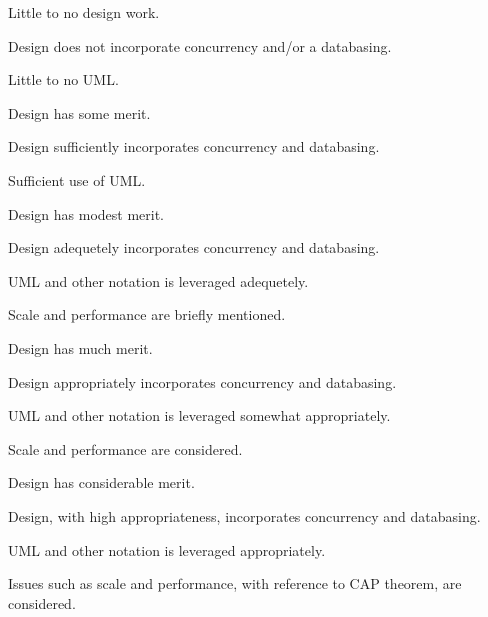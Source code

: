 \documentclass{../../fal_assignment}
\begin{document}
\rubricyeartwo
\begin{markingrubric}
%
%
        \grade\fail 	Little to no design work.
            \par 		Design does not incorporate concurrency and/or a databasing.
          \par 		Little to no UML.
          
        \grade 		Design has some merit.
            \par 		Design sufficiently incorporates concurrency and databasing. 
          \par 		Sufficient use of UML.
          
        \grade 		Design has modest merit.
            \par 		Design adequetely incorporates concurrency and databasing.  
          \par 		UML and other notation is leveraged adequetely.
            \par 		Scale and performance are briefly mentioned.
            
        \grade 		Design has much merit.
            \par 		Design appropriately incorporates concurrency and databasing.  
          \par 		UML and other notation is leveraged somewhat appropriately.
            \par 		Scale and performance are considered.
            
        \grade 		Design has considerable merit.
            \par 		Design, with high appropriateness, incorporates concurrency and databasing.  
          \par 		UML and other notation is leveraged appropriately.
            \par 		Issues such as scale and performance, with reference to CAP theorem, are considered.
            

\end{markingrubric}
\end{document}
